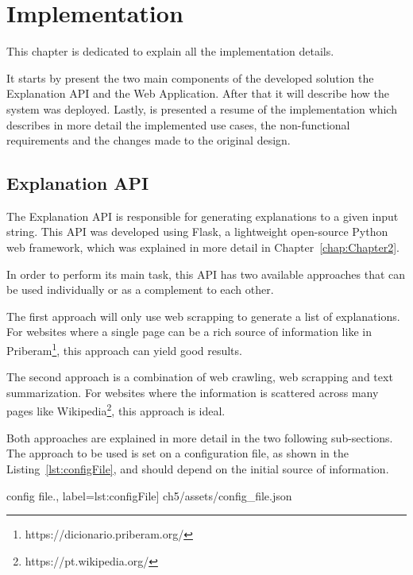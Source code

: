
\chapter{Implementation} %
\label{chap:Chapter5}

This chapter is dedicated to explain all the implementation details.

It starts by present the two main components of the developed solution the Explanation API and the Web Application.
After that it will describe how the system was deployed.
Lastly, is presented a resume of the implementation which describes in more detail the implemented use cases, the non-functional requirements and the changes made to the original design.

\section{Explanation API}

The Explanation API is responsible for generating explanations to a given input string.
This API was developed using Flask, a lightweight open-source Python web framework, which was explained in more detail in Chapter~\ref{chap:Chapter2}.

In order to perform its main task, this API has two available approaches that can be used individually or as a complement to each other.

The first approach will only use web scrapping to generate a list of explanations.
For websites where a single page can be a rich source of information like in Priberam\footnote{https://dicionario.priberam.org/}, this approach can yield good results.

The second approach is a combination of web crawling, web scrapping and text summarization.
For websites where the information is scattered across many pages like Wikipedia\footnote{https://pt.wikipedia.org/}, this approach is ideal.

Both approaches are explained in more detail in the two following sub-sections.
The approach to be used is set on a configuration file, as shown in the Listing~\ref{lst:configFile}, and should depend on the initial source of information.

\begin{center}
\begin{minipage}{0.95\linewidth}
 config file.,
label=lst:configFile]
{ch5/assets/config_file.json}
\end{minipage}
\end{center}

